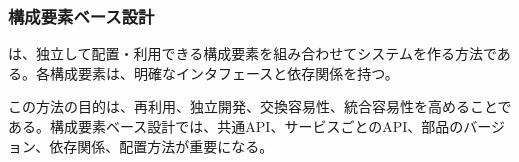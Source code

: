 \subsubsection{構成要素ベース設計}

 は、独立して配置・利用できる構成要素を組み合わせてシステムを作る方法である。各構成要素は、明確なインタフェースと依存関係を持つ。

この方法の目的は、再利用、独立開発、交換容易性、統合容易性を高めることである。構成要素ベース設計では、共通API、サービスごとのAPI、部品のバージョン、依存関係、配置方法が重要になる。
